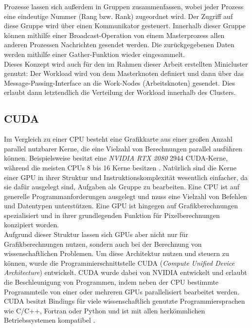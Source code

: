 \documentclass[doktyp=semarbeit, sprache=german]{TUBAFarbeiten}
\begin{document}
Prozesse lassen sich außerdem in Gruppen zusammenfassen, wobei jeder Prozess eine eindeutige Nummer (Rang bzw. Rank) zugeordnet wird. Der Zugriff auf diese Gruppe wird über einen Kommunikator gesteuert. Innerhalb dieser Gruppe können mithilfe einer Broadcast-Operation von einem Masterprozess allen anderen Prozessen Nachrichten gesendet werden. Die zurückgegebenen Daten werden mithilfe einer Gather-Funktion wieder eingesammelt.
\\Dieses Konzept wird auch für den im Rahmen dieser Arbeit erstellten Minicluster genutzt: Der Workload wird von dem Masterknoten definiert und dann über das Message-Passing-Interface an die Work-Nodes (Arbeitsknoten) gesendet. Dies erlaubt dann letztendlich die Verteilung der Workload innerhalb des Clusters.
\subsection{CUDA}
Im Vergleich zu einer CPU besteht eine Grafikkarte aus einer großen Anzahl parallel nutzbarer Kerne, die eine Vielzahl von Berechnungen parallel ausführen können. Beispielsweise besitzt eine \textit{NVIDIA RTX 2080} 2944 CUDA-Kerne, während die meisten CPUs 8 bis 16 Kerne besitzen \cite{RTXCores}. 
Natürlich sind die Kerne einer GPU in ihrer Struktur und Instruktionskomplexität wesentlich einfacher, da sie dafür ausgelegt sind, Aufgaben als Gruppe zu bearbeiten.
Eine CPU ist auf generelle Programmanforderungen ausgelegt und muss eine Vielzahl von Befehlen und Datentypen unterstützen. Eine GPU ist hingegen auf Grafikberechnungen spezialisiert und in ihrer grundlegenden Funktion für Pixelberechnungen konzipiert worden.
\\Aufgrund dieser Struktur lassen sich GPUs aber nicht nur für Grafikberechnungen nutzen, sondern auch bei der Berechnung von wissenschaftlichen Problemen.
Um diese Architektur nutzen und steuern zu können, wurde die Programmierschnittstelle CUDA (\textit{Compute Unified Device Architecture}) entwickelt. CUDA wurde dabei von NVIDIA entwickelt und erlaubt die Beschleunigung von Programmen, indem neben der CPU bestimmte Programmteile von einer oder mehreren GPUs parallelisiert bearbeitet werden.
\\CUDA besitzt Bindings für viele wissenschaftlich genutzte Programmiersprachen wie C/C++, Fortran oder Python und ist mit allen herkömmlichen Betriebssystemen kompatibel \cite{CUDADefinition}.
\end{document}
